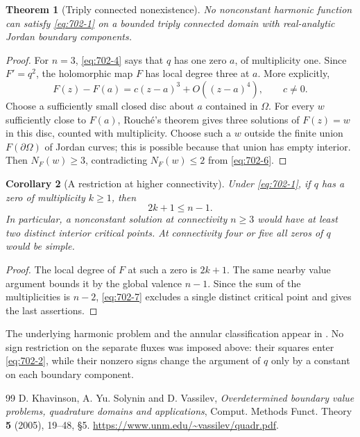 \documentclass[11pt,a4paper]{article}
\newtheorem{theorem}{Theorem}[section]
\newtheorem{corollary}[theorem]{Corollary}
\theoremstyle{remark}
\begin{document}
\begin{theorem}[Triply connected nonexistence]
No nonconstant harmonic function can satisfy \eqref{eq:702-1} on a bounded
triply connected domain with real-analytic Jordan boundary components.
\end{theorem}

\begin{proof}
For $n=3$, \eqref{eq:702-4} says that $q$ has one zero $a$, of multiplicity
one.  Since $F'=q^2$, the holomorphic map $F$ has local degree three
at $a$.  More explicitly,
\[
 F(z)-F(a)=c(z-a)^3+O((z-a)^4),\qquad c\ne0.
\]
Choose a sufficiently small closed disc about $a$ contained in
$\Omega$.  For every $w$ sufficiently close to $F(a)$, Rouch\'e's
theorem gives three solutions of $F(z)=w$ in this disc, counted with
multiplicity.  Choose such a $w$ outside the finite union
$F(\partial\Omega)$ of Jordan curves; this is possible because that
union has empty interior.
Then $N_F(w)\ge3$, contradicting $N_F(w)\le2$ from \eqref{eq:702-6}.
\end{proof}

\begin{corollary}[A restriction at higher connectivity]
Under \eqref{eq:702-1}, if $q$ has a zero of multiplicity $k\ge1$, then
\begin{equation}
 2k+1\le n-1.
 \label{eq:702-7}
\end{equation}
In particular, a nonconstant solution at connectivity $n\ge3$ would
have at least two distinct interior critical points.  At connectivity
four or five all zeros of $q$ would be simple.
\end{corollary}

\begin{proof}
The local degree of $F$ at such a zero is $2k+1$.  The same nearby
value argument bounds it by the global valence $n-1$.
Since the sum of the multiplicities is $n-2$, \eqref{eq:702-7} excludes a
single distinct critical point and gives the last assertions.
\end{proof}

The underlying harmonic problem and the annular classification appear
in \cite[Section 5, Theorem 5.5]{KhavinsonSolyninVassilev2005}.
No sign restriction on the separate fluxes was imposed above: their
squares enter \eqref{eq:702-2}, while their nonzero signs change the argument
of $q$ only by a constant on each boundary component.


\begingroup\small
\begin{thebibliography}{99}
 D. Khavinson, A. Yu. Solynin and D. Vassilev, \emph{Overdetermined boundary value problems, quadrature domains and applications}, Comput. Methods Funct. Theory \textbf{5} (2005), 19--48, \S5. \url{https://www.unm.edu/~vassilev/quadr.pdf}.
\end{thebibliography}
\endgroup
\end{document}
